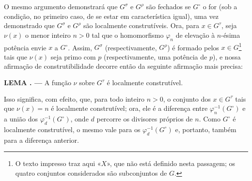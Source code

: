 \documentclass[11pt,twoside,openany]{book}
\numberwithin{equation}{section}
\theoremstyle{plain}
\theoremstyle{definition}
\theoremstyle{remark}
\newcommand{\result}[2]{%
  \par\medskip\noindent\textbf{#1%
  \if\relax\detokenize{#2}\relax\else\space#2\fi. ---}\enspace
}
\begin{document}
O mesmo argumento demonstrará que $G^\sigma$ e $G^\rho$ são fechados se
$G^\circ$ o for (sob a condição, no primeiro caso, de se estar em
característica igual), uma vez demonstrado que $G^\sigma$ e $G^\rho$ são
localmente construtíveis. Ora, para $x\in G^\tau$, seja $\nu(x)$ o menor
inteiro $n>0$ tal que o homomorfismo $\varphi_n$ de elevação à $n$-ésima
potência envie $x$ a $G^\circ$. Assim, $G^\sigma$ (respectivamente,
$G^\rho$) é formado pelos $x\in G$\footnote{O texto impresso traz aqui
«$X$», que não está definido nesta passagem; os quatro conjuntos considerados
são subconjuntos de $G$.} tais que $\nu(x)$ seja primo com $p$
(respectivamente, uma potência de $p$), e nossa afirmação de construtibilidade
decorre então da seguinte afirmação mais precisa:

\result{LEMA}{1.4} A função $\nu$ sobre $G^\tau$ é localmente construtível.

Isso significa, com efeito, que, para todo inteiro $n>0$, o conjunto dos
$x\in G^\tau$ tais que $\nu(x)=n$ é localmente construtível; ora, ele é a
diferença entre $\varphi_n^{-1}(G^\circ)$ e a união dos
$\varphi_d^{-1}(G^\circ)$, onde $d$ percorre os divisores próprios de $n$.
Como $G^\circ$ é localmente construtível, o mesmo vale para os
$\varphi_d^{-1}(G^\circ)$ e, portanto, também para a diferença anterior.
\end{document}
